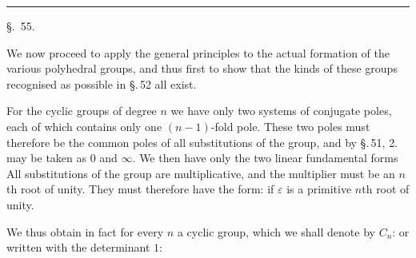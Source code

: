 
\begin{center}

\textbf{}

\rule{3cm}{0.4pt}

\S.\ 55.
\end{center}

\begin{center}
\end{center}

We now proceed to apply the general principles to the actual formation of the
various polyhedral groups, and thus first to show that the kinds of these groups
recognised as possible in \S.\,52 all exist.

For the cyclic groups of degree $n$ we have only two
systems of conjugate poles, each of which contains only one $(n-1)$-fold
pole. These two poles must therefore be the common
poles of all substitutions of the group, and by
\S.\,51, 2. may be taken as $0$ and $\infty$. We then have
only the two linear fundamental forms
All substitutions of the group are multiplicative, and the
multiplier must be an $n$th root of unity. They must therefore
have the form:
if $\varepsilon$ is a primitive $n$th root of unity.

We thus obtain in fact for every $n$ a cyclic
group, which we shall denote by $C_n$:
or written with the determinant $1$:
